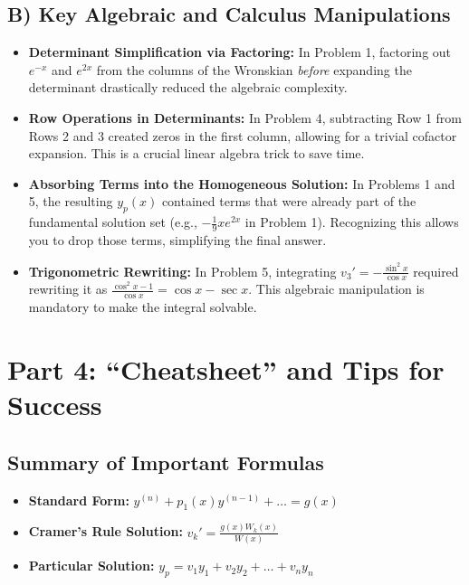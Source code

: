 \documentclass[12pt]{article}
\begin{document}
\subsection{B) Key Algebraic and Calculus Manipulations}
\begin{itemize}
    \item \textbf{Determinant Simplification via Factoring:} In Problem 1, factoring out $e^{-x}$ and $e^{2x}$ from the columns of the Wronskian \textit{before} expanding the determinant drastically reduced the algebraic complexity.
    \item \textbf{Row Operations in Determinants:} In Problem 4, subtracting Row 1 from Rows 2 and 3 created zeros in the first column, allowing for a trivial cofactor expansion. This is a crucial linear algebra trick to save time.
    \item \textbf{Absorbing Terms into the Homogeneous Solution:} In Problems 1 and 5, the resulting $y_p(x)$ contained terms that were already part of the fundamental solution set (e.g., $-\frac{1}{9}x e^{2x}$ in Problem 1). Recognizing this allows you to drop those terms, simplifying the final answer.
    \item \textbf{Trigonometric Rewriting:} In Problem 5, integrating $v_3' = -\frac{\sin^2 x}{\cos x}$ required rewriting it as $\frac{\cos^2 x - 1}{\cos x} = \cos x - \sec x$. This algebraic manipulation is mandatory to make the integral solvable.
\end{itemize}

\newpage
\section{Part 4: ``Cheatsheet'' and Tips for Success}

\subsection{Summary of Important Formulas}
\begin{itemize}
    \item \textbf{Standard Form:} $y^{(n)} + p_1(x)y^{(n-1)} + \dots = g(x)$
    \item \textbf{Cramer's Rule Solution:} $v_k' = \frac{g(x)W_k(x)}{W(x)}$
    \item \textbf{Particular Solution:} $y_p = v_1 y_1 + v_2 y_2 + \dots + v_n y_n$
\end{itemize}
\end{document}
